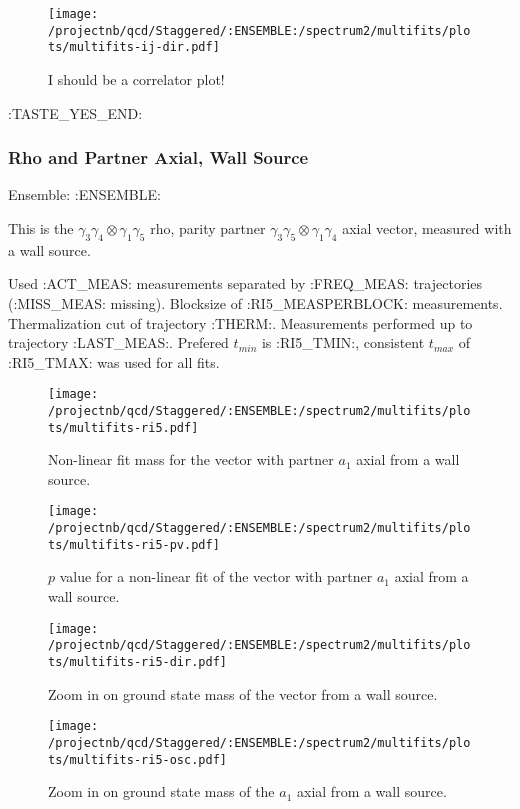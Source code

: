\begin{figure}[H]
\centering
\texttt{[image: /projectnb/qcd/Staggered/:ENSEMBLE:/spectrum2/multifits/plots/multifits-ij-dir.pdf]}
\caption{I should be a correlator plot!}
\end{figure}

\clearpage
:TASTE_YES_END:

\subsubsection{Rho and Partner Axial, Wall Source}

Ensemble: :ENSEMBLE:

This is the $\gamma_3 \gamma_4 \otimes \gamma_1 \gamma_5$ rho, parity partner $\gamma_3 \gamma_5 \otimes \gamma_1 \gamma_4$ axial vector, measured with a wall source. 

{\small{Used :ACT_MEAS: measurements separated by :FREQ_MEAS: trajectories (:MISS_MEAS: missing). Blocksize of :RI5_MEASPERBLOCK: measurements. Thermalization cut of trajectory :THERM:. Measurements performed up to trajectory :LAST_MEAS:. Prefered $t_{min}$ is :RI5_TMIN:, consistent $t_{max}$ of :RI5_TMAX: was used for all fits.}}


\begin{multicols}{2}
\begin{figure}[H]
\centering
\texttt{[image: /projectnb/qcd/Staggered/:ENSEMBLE:/spectrum2/multifits/plots/multifits-ri5.pdf]}
\caption{Non-linear fit mass for the vector with partner $a_1$ axial from a wall source.}
\end{figure}
\columnbreak
\begin{figure}[H]
\centering
\texttt{[image: /projectnb/qcd/Staggered/:ENSEMBLE:/spectrum2/multifits/plots/multifits-ri5-pv.pdf]}
\caption{$p$ value for a non-linear fit of the vector with partner $a_1$ axial from a wall source.}
\end{figure}
\end{multicols}

\begin{multicols}{2}
\begin{figure}[H]
\centering
\texttt{[image: /projectnb/qcd/Staggered/:ENSEMBLE:/spectrum2/multifits/plots/multifits-ri5-dir.pdf]}
\caption{Zoom in on ground state mass of the vector from a wall source.}
\end{figure}
\columnbreak
\begin{figure}[H]
\centering
\texttt{[image: /projectnb/qcd/Staggered/:ENSEMBLE:/spectrum2/multifits/plots/multifits-ri5-osc.pdf]}
\caption{Zoom in on ground state mass of the $a_1$ axial from a wall source.}
\end{figure}
\end{multicols}

